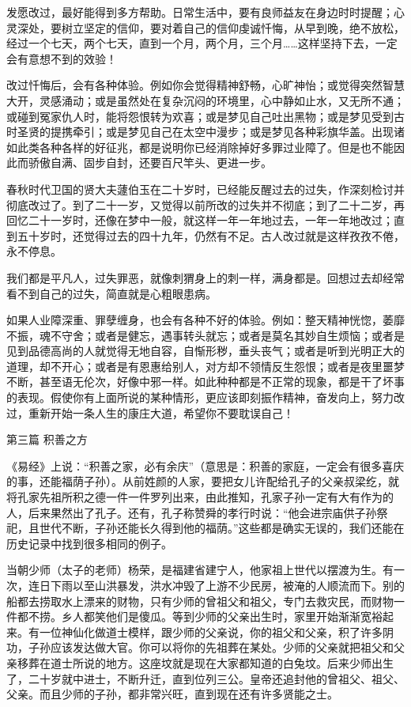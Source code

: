 \documentclass[12pt,UTF8]{ctexbook}
\begin{document}
发愿改过，最好能得到多方帮助。日常生活中，要有良师益友在身边时时提醒；心灵深处，要树立坚定的信仰，要对着自己的信仰虔诚忏悔，从早到晚，绝不放松，经过一个七天，两个七天，直到一个月，两个月，三个月……这样坚持下去，一定会有意想不到的效验！

改过忏悔后，会有各种体验。例如你会觉得精神舒畅，心旷神怡；或觉得突然智慧大开，灵感涌动；或是虽然处在复杂沉闷的环境里，心中静如止水，又无所不通；或碰到冤家仇人时，能将怨恨转为欢喜；或是梦见自己吐出黑物；或是梦见受到古时圣贤的提携牵引；或是梦见自己在太空中漫步；或是梦见各种彩旗华盖。出现诸如此类各种各样的好征兆，都是说明你已经消除掉好多罪过业障了。但是也不能因此而骄傲自满、固步自封，还要百尺竿头、更进一步。

春秋时代卫国的贤大夫蘧伯玉在二十岁时，已经能反醒过去的过失，作深刻检讨并彻底改过了。到了二十一岁，又觉得以前所改的过失并不彻底；到了二十二岁，再回忆二十一岁时，还像在梦中一般，就这样一年一年地过去，一年一年地改过；直到五十岁时，还觉得过去的四十九年，仍然有不足。古人改过就是这样孜孜不倦，永不停息。

我们都是平凡人，过失罪恶，就像刺猬身上的刺一样，满身都是。回想过去却经常看不到自己的过失，简直就是心粗眼患病。

如果人业障深重、罪孽缠身，也会有各种不好的体验。例如：整天精神恍惚，萎靡不振，魂不守舍；或者是健忘，遇事转头就忘；或者是莫名其妙自生烦恼；或者是见到品德高尚的人就觉得无地自容，自惭形秽，垂头丧气；或者是听到光明正大的道理，却不开心；或者是有恩惠给别人，对方却不领情反生怨恨；或者是夜里噩梦不断，甚至语无伦次，好像中邪一样。如此种种都是不正常的现象，都是干了坏事的表现。假使你有上面所说的某种情形，更应该即刻振作精神，奋发向上，努力改过，重新开始一条人生的康庄大道，希望你不要耽误自己！

第三篇 积善之方

《易经》上说：“积善之家，必有余庆”（意思是：积善的家庭，一定会有很多喜庆的事，还能福荫子孙）。从前姓颜的人家，要把女儿许配给孔子的父亲叔梁纥，就将孔家先祖所积之德一件一件罗列出来，由此推知，孔家子孙一定有大有作为的人，后来果然出了孔子。还有，孔子称赞舜的孝行时说：“他会进宗庙供子孙祭祀，且世代不断，子孙还能长久得到他的福荫。”这些都是确实无误的，我们还能在历史记录中找到很多相同的例子。

当朝少师（太子的老师）杨荣，是福建省建宁人，他家祖上世代以摆渡为生。有一次，连日下雨以至山洪暴发，洪水冲毁了上游不少民房，被淹的人顺流而下。别的船都去捞取水上漂来的财物，只有少师的曾祖父和祖父，专门去救灾民，而财物一件都不捞。乡人都笑他们是傻瓜。等到少师的父亲出生时，家里开始渐渐宽裕起来。有一位神仙化做道士模样，跟少师的父亲说，你的祖父和父亲，积了许多阴功，子孙应该发达做大官。你可以将你的先祖葬在某处。少师的父亲就把祖父和父亲移葬在道士所说的地方。这座坟就是现在大家都知道的白兔坟。后来少师出生了，二十岁就中进士，不断升迁，直到位列三公。皇帝还追封他的曾祖父、祖父、父亲。而且少师的子孙，都非常兴旺，直到现在还有许多贤能之士。
\end{document}
